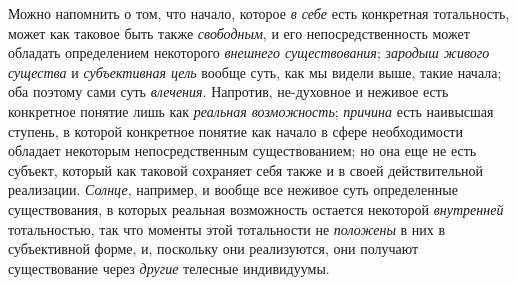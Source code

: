 Можно напомнить о том, что начало, которое {\em в себе} есть
конкретная тотальность, может как таковое быть также {\em свободным}, и его
непосредственность может обладать определением некоторого
{\em внешнего существования};
{\em зародыш живого существа} и {\em субъективная цель}
вообще суть, как мы видели выше, такие начала; оба поэтому
сами суть {\em влечения}.
Напротив, не-духовное и неживое есть конкретное понятие лишь
как {\em реальная возможность}; {\em причина} есть
наивысшая ступень, в которой конкретное понятие как начало в сфере
необходимости обладает некоторым непосредственным существованием; но она
еще не есть субъект, который как таковой сохраняет себя также и в своей
действительной реализации. {\em Солнце}, например, и
вообще все неживое суть определенные существования, в которых реальная
возможность остается некоторой {\em внутренней}
тотальностью, так что моменты этой тотальности не
{\em положены}
в них в субъективной форме, и, поскольку они реализуются, они
получают существование через {\em другие} телесные индивидуумы.

